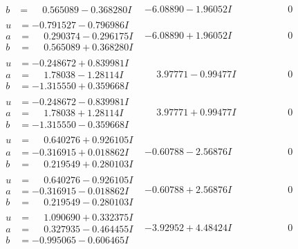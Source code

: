 \documentclass[1p]{elsarticle_modified}
\theoremstyle{definition}
\begin{document}
$$\begin{array}{c|c|c}
\begin{aligned}
b &= \phantom{-}0.565089 - 0.368280 I\end{aligned}
 & -6.08890 - 1.96052 I & \phantom{-0.000000 } 0 \\ \hline\begin{aligned}
u &= -0.791527 - 0.796986 I \\
a &= \phantom{-}0.290374 - 0.296175 I \\
b &= \phantom{-}0.565089 + 0.368280 I\end{aligned}
 & -6.08890 + 1.96052 I & \phantom{-0.000000 } 0 \\ \hline\begin{aligned}
u &= -0.248672 + 0.839981 I \\
a &= \phantom{-}1.78038 - 1.28114 I \\
b &= -1.315550 + 0.359668 I\end{aligned}
 & \phantom{-}3.97771 - 0.99477 I & \phantom{-0.000000 } 0 \\ \hline\begin{aligned}
u &= -0.248672 - 0.839981 I \\
a &= \phantom{-}1.78038 + 1.28114 I \\
b &= -1.315550 - 0.359668 I\end{aligned}
 & \phantom{-}3.97771 + 0.99477 I & \phantom{-0.000000 } 0 \\ \hline\begin{aligned}
u &= \phantom{-}0.640276 + 0.926105 I \\
a &= -0.316915 + 0.018862 I \\
b &= \phantom{-}0.219549 + 0.280103 I\end{aligned}
 & -0.60788 - 2.56876 I & \phantom{-0.000000 } 0 \\ \hline\begin{aligned}
u &= \phantom{-}0.640276 - 0.926105 I \\
a &= -0.316915 - 0.018862 I \\
b &= \phantom{-}0.219549 - 0.280103 I\end{aligned}
 & -0.60788 + 2.56876 I & \phantom{-0.000000 } 0 \\ \hline\begin{aligned}
u &= \phantom{-}1.090690 + 0.332375 I \\
a &= \phantom{-}0.327935 - 0.464455 I \\
b &= -0.995065 - 0.606465 I\end{aligned}
 & -3.92952 + 4.48424 I & \phantom{-0.000000 } 0 \\ \hline\begin{aligned}

\end{aligned}
\end{array}$$
\end{document}

